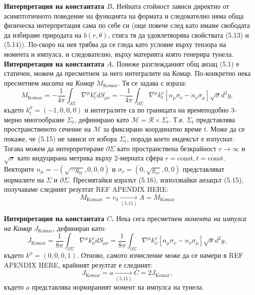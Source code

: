\noindent\textbf{Интерпретация на константата $B$.} Нейната стойност зависи директно от асимптотичното поведение на функцията на формата и следователно няма обща физическа интерпретация сама по себе си (още повече след като имаме свободата да избираме природата на $b(r,\theta)$, стига тя да удовлетворява свойствата (5.13) и (5.14)). По-скоро на нея трябва да се гледа като условие върху тензора на момента и импулса, и следователно, върху материята която генерира тунела.\\

\noindent\textbf{Интерпретация на константата $A$.} Понеже разглежданият общ анзац (5.1) е статичен, можем да пресметнем за него интегралите на Комар. По-конкретно нека пресметнем \emph{масата на Комар} $M_{\text{Komar}}$. Тя се задава с израза:
\begin{equation}
	M_{\text{Komar}} = -\frac{1}{4\pi}\int_{\partial\Sigma}\nabla^\mu k^\nu_t dS_{\mu\nu} =  -\frac{1}{4\pi}\int_{\partial\Sigma}\nabla^\mu k^\nu_t\left[n_\mu\sigma_\nu - n_\nu\sigma_\mu\right] \sqrt{\sigma}d^2y,
\end{equation}
където $k^\mu_t = (-1,0,0,0)$ и интегралите са по границата на времеподобно 3-мерно многообразие $\Sigma_t$, дефинирано като $\mathcal{M} = \mathcal{R} \times \Sigma_t$. Т.е. $\Sigma_t$ представлява пространственото сечение на $\mathcal{M}$ за фиксирано координатно време $t$. Може да се покаже, че (5.15) не зависи от избора $\Sigma_t$, поради което индексът е изпуснат. Тогава можем да интерпретираме $\partial\Sigma$ като пространствена безкрайност $r\rightarrow\infty$ и $\sqrt{\sigma}$ като индуцирана метрика върху 2-мерната сфера $r = \text{const}, t = \text{const}$. Векторите $n_\mu = - (\sqrt{-g_{tt}}, 0, 0, 0)$ и $\sigma_\nu = (0, \sqrt{g_{rr}},0 ,0)$ представляват нормалите на $\Sigma$ и $\partial\Sigma$. Пресмятайки изразът (5.16), използвайки анзацът (5.15), получаваме следният резултат REF APENDIX HERE:
\begin{equation}
	M_{\text{Komarr}} = r_0 \xrightarrow[(5.15)]{} A = M_{\text{Komar}}
\end{equation}

\noindent\textbf{Интерпретация на константата $C$.} Нека сега пресметнем \emph{момента на импулса на Комар} $J_{\text{Komar}}$, дефиниран като:
\begin{equation}
	J_{\text{Komar}} = \frac{1}{8\pi}\int_{\partial\Sigma}\nabla^\mu k^\nu_\phi dS_{\mu\nu} = \frac{1}{8\pi}\int_{\partial\Sigma}\nabla^\mu k^\nu_\phi\left[n_\mu\sigma_\nu - n_\nu\sigma_\mu\right] \sqrt{\sigma}d^2y,
\end{equation}
където $k^\phi = (0, 0, 0, 1)$. Отново, самото изчисление може да се намери в REF APENDIX HERE, крайният резултат е следният:
\begin{equation}
	J_\text{Komar} = a\xrightarrow[(5.15)]{} C = 2J_\text{Komar}, 
\end{equation}
където $a$ представлява нормираният момент на импулса на тунела.
